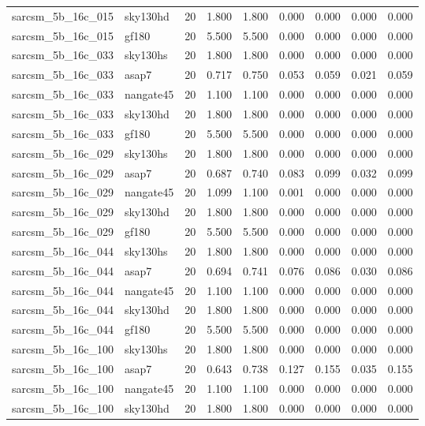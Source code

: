 \begin{tabular}{llrrrrrrr}
sarcsm\_5b\_16c\_015 & sky130hd & 20 & 1.800 & 1.800 & 0.000 & 0.000 & 0.000 & 0.000 \\
sarcsm\_5b\_16c\_015 & gf180 & 20 & 5.500 & 5.500 & 0.000 & 0.000 & 0.000 & 0.000 \\
sarcsm\_5b\_16c\_033 & sky130hs & 20 & 1.800 & 1.800 & 0.000 & 0.000 & 0.000 & 0.000 \\
sarcsm\_5b\_16c\_033 & asap7 & 20 & 0.717 & 0.750 & 0.053 & 0.059 & 0.021 & 0.059 \\
sarcsm\_5b\_16c\_033 & nangate45 & 20 & 1.100 & 1.100 & 0.000 & 0.000 & 0.000 & 0.000 \\
sarcsm\_5b\_16c\_033 & sky130hd & 20 & 1.800 & 1.800 & 0.000 & 0.000 & 0.000 & 0.000 \\
sarcsm\_5b\_16c\_033 & gf180 & 20 & 5.500 & 5.500 & 0.000 & 0.000 & 0.000 & 0.000 \\
sarcsm\_5b\_16c\_029 & sky130hs & 20 & 1.800 & 1.800 & 0.000 & 0.000 & 0.000 & 0.000 \\
sarcsm\_5b\_16c\_029 & asap7 & 20 & 0.687 & 0.740 & 0.083 & 0.099 & 0.032 & 0.099 \\
sarcsm\_5b\_16c\_029 & nangate45 & 20 & 1.099 & 1.100 & 0.001 & 0.000 & 0.000 & 0.000 \\
sarcsm\_5b\_16c\_029 & sky130hd & 20 & 1.800 & 1.800 & 0.000 & 0.000 & 0.000 & 0.000 \\
sarcsm\_5b\_16c\_029 & gf180 & 20 & 5.500 & 5.500 & 0.000 & 0.000 & 0.000 & 0.000 \\
sarcsm\_5b\_16c\_044 & sky130hs & 20 & 1.800 & 1.800 & 0.000 & 0.000 & 0.000 & 0.000 \\
sarcsm\_5b\_16c\_044 & asap7 & 20 & 0.694 & 0.741 & 0.076 & 0.086 & 0.030 & 0.086 \\
sarcsm\_5b\_16c\_044 & nangate45 & 20 & 1.100 & 1.100 & 0.000 & 0.000 & 0.000 & 0.000 \\
sarcsm\_5b\_16c\_044 & sky130hd & 20 & 1.800 & 1.800 & 0.000 & 0.000 & 0.000 & 0.000 \\
sarcsm\_5b\_16c\_044 & gf180 & 20 & 5.500 & 5.500 & 0.000 & 0.000 & 0.000 & 0.000 \\
sarcsm\_5b\_16c\_100 & sky130hs & 20 & 1.800 & 1.800 & 0.000 & 0.000 & 0.000 & 0.000 \\
sarcsm\_5b\_16c\_100 & asap7 & 20 & 0.643 & 0.738 & 0.127 & 0.155 & 0.035 & 0.155 \\
sarcsm\_5b\_16c\_100 & nangate45 & 20 & 1.100 & 1.100 & 0.000 & 0.000 & 0.000 & 0.000 \\
sarcsm\_5b\_16c\_100 & sky130hd & 20 & 1.800 & 1.800 & 0.000 & 0.000 & 0.000 & 0.000 \\

\end{tabular}
